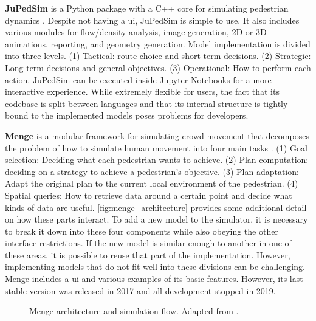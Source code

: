 \documentclass[twoside, 11pt]{article}
\begin{document}
\textbf{JuPedSim} is a Python package with a C++ core for simulating pedestrian dynamics \cite{kemlohwagoumJuPedSimOpenFramework2015}. Despite not having a \gls{ui}, JuPedSim is simple to use. It also includes various modules for flow/density analysis, image generation, 2D or 3D animations, reporting, and geometry generation. Model implementation is divided into three levels. (1) Tactical: route choice and short-term decisions. (2) Strategic: Long-term decisions and general objectives. (3) Operational: How to perform each action. JuPedSim can be executed inside Jupyter Notebooks for a more interactive experience. While extremely flexible for users, the fact that its codebase is split between languages and that its internal structure is tightly bound to the implemented models poses problems for developers.

\textbf{Menge} is a modular framework for simulating crowd movement that decomposes the problem of how to simulate human movement into four main tasks \cite{curtisMengeModularFramework2016}. (1) Goal selection: Deciding what each pedestrian wants to achieve. (2) Plan computation: deciding on a strategy to achieve a pedestrian's objective. (3) Plan adaptation: Adapt the original plan to the current local environment of the pedestrian. (4) Spatial queries: How to retrieve data around a certain point and decide what kinds of data are useful. \autoref{fig:menge_architecture} provides some additional detail on how these parts interact. To add a new model to the simulator, it is necessary to break it down into these four components while also obeying the other interface restrictions. If the new model is similar enough to another in one of these areas, it is possible to reuse that part of the implementation. However, implementing models that do not fit well into these divisions can be challenging. Menge includes a \gls{ui} and various examples of its basic features. However, its last stable version was released in 2017 and all development stopped in 2019.

\begin{figure}[h]
  \centering
  
  \caption[Menge architecture and simulation flow]{Menge architecture and simulation flow. Adapted from \cite{curtisMengeModularFramework2016}.}
  \label{fig:menge_architecture}
\end{figure}
\end{document}
